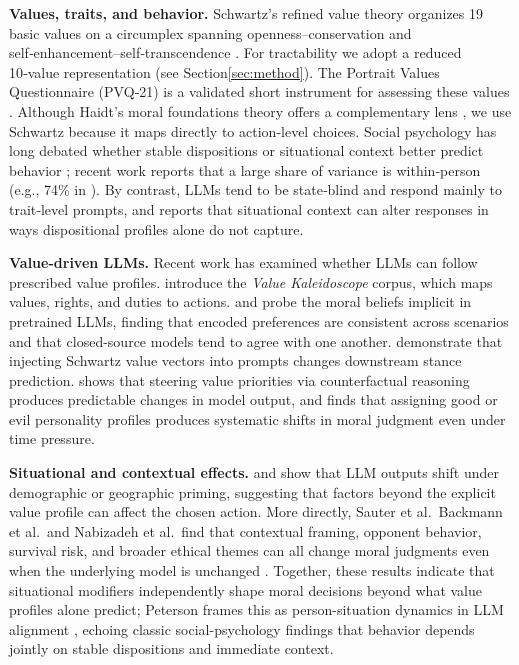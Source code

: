 \documentclass[11pt]{article}
\begin{document}
\textbf{Values, traits, and behavior.}
Schwartz's refined value theory organizes 19 basic values on a circumplex spanning openness–conservation and self‑enhancement–self‑transcendence \citep{schwartz2012refined}. For tractability we adopt a reduced 10‑value representation (see Section\ref{sec:method}). The Portrait Values Questionnaire (PVQ‑21) is a validated short instrument for assessing these values \citep{schwartz2003proposal}. Although Haidt's moral foundations theory offers a complementary lens \citep{haidt2012righteous}, we use Schwartz because it maps directly to action‑level choices. Social psychology has long debated whether stable dispositions or situational context better predict behavior \citep{mischel1968personality, ross1991person}; recent work reports that a large share of variance is within‑person (e.g., 74\% in \citealp{harry2026beyond}). By contrast, LLMs tend to be state‑blind and respond mainly to trait‑level prompts, and \citep{soni2025we}
reports that situational context can alter responses in ways dispositional profiles alone do not capture.

\textbf{Value-driven LLMs.}
Recent work has examined whether LLMs can follow prescribed value profiles. \citet{sorensen2024value} introduce the \emph{Value Kaleidoscope} corpus, which maps values, rights, and duties to actions. \citet{abdulhai2023moral} and \citet{scherrer2023evaluating} probe the moral beliefs implicit in pretrained LLMs, finding that encoded preferences are consistent across scenarios and that closed-source models tend to agree with one another. \citet{kang2023values} demonstrate that injecting Schwartz value vectors into prompts changes downstream stance prediction. \citep{guo2026counterfactual} shows that steering value priorities via counterfactual reasoning produces predictable changes in model output, and \citep{jiao2025ai} finds that assigning good or evil personality profiles produces systematic shifts in moral judgment even under time pressure. 

\textbf{Situational and contextual effects.}
\citet{santurkar2023whose} and \citet{durmus2023globalopinionqa} show that LLM outputs shift under demographic or geographic priming, suggesting that factors beyond the explicit value profile can affect the chosen action. More directly, Sauter et al.\, Backmann et al.\, and Nabizadeh et al.\ find that contextual framing, opponent behavior, survival risk, and broader ethical themes can all change moral judgments even when the underlying model is unchanged \citep{sauter2026between, backmann2025ethics, nabizadeh2026large}. Together, these results indicate that situational modifiers independently shape moral decisions beyond what value profiles alone predict; Peterson frames this as person-situation dynamics in LLM alignment \citep{peterson2025context}, echoing classic social-psychology findings that behavior depends jointly on stable dispositions and immediate context.
\end{document}
